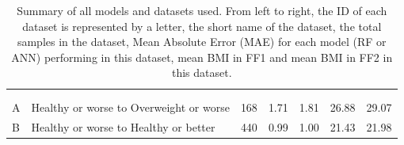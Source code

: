 \begin{table}[H]

\caption{Summary of all models and datasets used. From left to right, the ID of each dataset is represented by a letter, the short name of the dataset, the total samples in the dataset, Mean Absolute Error (MAE) for each model (RF or ANN) performing in this dataset, mean BMI in FF1 and mean BMI in FF2 in this dataset.}
\centering
\begin{tabular}{lllllll}
\multicolumn{3}{l}{{\color[HTML]{000000} }}                                                                                                                                                                                  & \multicolumn{2}{c}{\cellcolor[HTML]{FFE599}{\color[HTML]{000000} MAE}}                                                                         & \multicolumn{2}{c}{\cellcolor[HTML]{FFE599}{\color[HTML]{000000} Mean BMI}}                                                                     \\
\rowcolor[HTML]{FFF2CC} 
\multicolumn{1}{c}{\cellcolor[HTML]{FFF2CC}{\color[HTML]{000000} ID}} & \multicolumn{1}{c}{\cellcolor[HTML]{FFF2CC}{\color[HTML]{000000} Name}} & \multicolumn{1}{c}{\cellcolor[HTML]{FFF2CC}{\color[HTML]{000000} Samples}} & \multicolumn{1}{c}{\cellcolor[HTML]{FFF2CC}{\color[HTML]{000000} RF}} & \multicolumn{1}{c}{\cellcolor[HTML]{FFF2CC}{\color[HTML]{000000} ANN}} & \multicolumn{1}{c}{\cellcolor[HTML]{FFF2CC}{\color[HTML]{000000} FF1}} & \multicolumn{1}{c}{\cellcolor[HTML]{FFF2CC}{\color[HTML]{000000} FF2}} \\
{\color[HTML]{000000} A}                                              & {\color[HTML]{000000} Healthy or worse to Overweight or worse}          & {\color[HTML]{000000} 168}                                                 & {\color[HTML]{000000} 1.71}                                           & {\color[HTML]{000000} 1.81}                                            & {\color[HTML]{000000} 26.88}                                           & {\color[HTML]{000000} 29.07}                                           \\
{\color[HTML]{000000} B}                                              & {\color[HTML]{000000} Healthy or worse to Healthy or better}            & {\color[HTML]{000000} 440}                                                 & {\color[HTML]{000000} 0.99}                                           & {\color[HTML]{000000} 1.00}                                            & {\color[HTML]{000000} 21.43}                                           & {\color[HTML]{000000} 21.98}                                           \\

\end{tabular}
\end{table}
